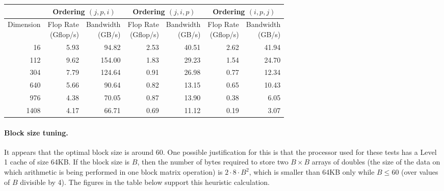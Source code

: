 \documentclass[11pt]{article}
\theoremstyle{plain} %
\begin{document}
\begin{center}
\small
\begin{tabular}{r|rr|rr|rr}
  & \multicolumn{2}{c|}{Ordering $(j, p, i)$} & \multicolumn{2}{c|}{Ordering $(j, i, p)$} & \multicolumn{2}{c}{Ordering $(i, p, j)$} \\
  \hline
  Dimension & \makecell{Flop Rate \\ (Gflop/s)} & \makecell{Bandwidth \\ (GB/s)} & \makecell{Flop Rate \\ (Gflop/s)} & \makecell{Bandwidth \\ (GB/s)} & \makecell{Flop Rate \\ (Gflop/s)} & \makecell{Bandwidth \\ (GB/s)} \\
  \hline
  16 & 5.93 & 94.82 & 2.53 & 40.51 & 2.62 & 41.94 \\
  112 & 9.62 & 154.00 & 1.83 & 29.23 & 1.54 & 24.70 \\
  304 & 7.79 & 124.64 & 0.91 & 26.98 & 0.77 & 12.34 \\
  640 & 5.66 & 90.64 & 0.82 & 13.15 & 0.65 & 10.43 \\
  976 & 4.38 & 70.05 & 0.87 & 13.90 & 0.38 & 6.05 \\
  1408 & 4.17 & 66.71 & 0.69 & 11.12 & 0.19 & 3.07 \\
  \hline
\end{tabular}
\end{center}

\paragraph{Block size tuning.}

It appears that the optimal block size is around 60.
One possible justification for this is that the processor used for these tests has a Level 1 cache of size 64KB.
If the block size is $B$, then the number of bytes required to store two $B \times B$ arrays of doubles (the size of the data on which arithmetic is being performed in one block matrix operation) is $2 \cdot 8 \cdot B^2$, which is smaller than 64KB only while $B \leq 60$ (over values of $B$ divisible by 4).
The figures in the table below support this heuristic calculation.
\end{document}
